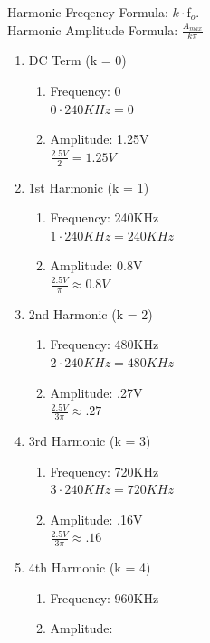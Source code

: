 \documentclass[letterpaper, 11pt]{article}
\begin{document}
Harmonic Freqency Formula: $k \cdot $f$_o$.
\\ \indent Harmonic Amplitude Formula: $\frac{A_{max}}{k\pi}$
\begin{enumerate}
    \item DC Term (k = 0)
    \begin{enumerate}
        \item Frequency: 0
        \\$0 \cdot 240KHz = 0$
        \item Amplitude: 1.25V
        \\$\frac{2.5V}{2} = 1.25V$
    \end{enumerate}

    \item 1st Harmonic (k = 1)
    \begin{enumerate}
        \item Frequency: 240KHz
        \\$1 \cdot 240KHz = 240KHz$
        \item Amplitude: 0.8V
        \\$\frac{2.5V}{\pi} \approx 0.8V$
    \end{enumerate}

    \item 2nd Harmonic (k = 2)
    \begin{enumerate}
        \item Frequency: 480KHz
        \\$2 \cdot 240KHz = 480KHz$
        \item Amplitude: .27V
        \\$\frac{2.5V}{3\pi} \approx .27$
    \end{enumerate}

    \item 3rd Harmonic (k = 3)
    \begin{enumerate}
        \item Frequency: 720KHz
        \\$3 \cdot 240KHz = 720KHz$
        \item Amplitude: .16V
        \\$\frac{2.5V}{3\pi} \approx .16$
    \end{enumerate}

    \item 4th Harmonic (k = 4)
    \begin{enumerate}
        \item Frequency: 960KHz
        \item Amplitude: 
    \end{enumerate}
\end{enumerate}
\end{document}
